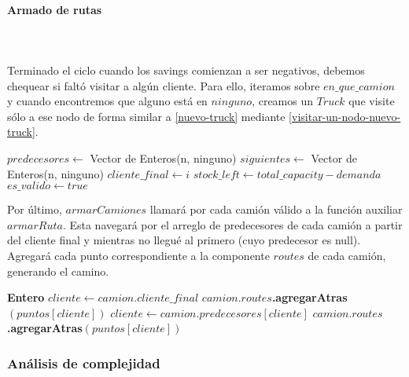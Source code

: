 \paragraph{Armado de rutas} \hspace{0pt} \\
\\
Terminado el ciclo cuando los savings comienzan a ser negativos, debemos chequear si faltó visitar a algún cliente. Para ello, iteramos sobre $en\_que\_camion$ y cuando encontremos que alguno está en $ninguno$, creamos un $Truck$ que visite sólo a ese nodo de forma similar a \ref{nuevo-truck} mediante \ref{visitar-un-nodo-nuevo-truck}.
\begin{algorithm}[H]
	\caption{\Comment $\mathcal{O}(n)$}
	\label{visitar-un-nodo-nuevo-truck}
	\begin{algorithmic}[1]
		\State $predecesores \gets$ Vector de Enteros(n, ninguno)
		\State $siguientes \gets$ Vector de Enteros(n, ninguno)
		\State $cliente\_final \gets i$	
		\State $stock\_left \gets total\_capacity - demanda$ 
		\State $es\_valido \gets  true$ 
		\EndFunction
	\end{algorithmic}
\end{algorithm}
Por último,  $armarCamiones$ llamará por cada camión válido a la función auxiliar $armarRuta$. Esta navegará por el arreglo de predecesores de cada camión a partir del cliente final y mientras no llegué al primero (cuyo predecesor es null). Agregará cada punto correspondiente a la componente $routes$ de cada camión, generando el camino. 
\begin{algorithm}[H]
	\caption{\Comment $\mathcal{O}(n)$}
	\label{armar-ruta}
	\begin{algorithmic}[1]
		\State \textbf{Entero} $cliente \gets camion.cliente\_final$
		\State $camion.routes$\textbf{.agregarAtras}$(puntos[cliente])$
		\State $cliente \gets camion.predecesores[cliente]$
		\State $camion.routes$\textbf{.agregarAtras}$(puntos[cliente])$
		\EndWhile
		\EndFunction
	\end{algorithmic}
\end{algorithm}
\subsubsection{Análisis de complejidad}

